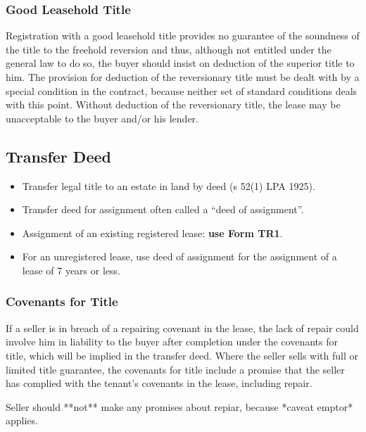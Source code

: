\documentclass[
]{article}
\newenvironment{Shaded}{}{}
\newcommand{\NormalTok}[1]{#1}
\providecommand{\tightlist}{%
  \setlength{\itemsep}{0pt}\setlength{\parskip}{0pt}}
\begin{document}
\hypertarget{good-leasehold-title}{%
\subsubsection{Good Leasehold Title}\label{good-leasehold-title}}

Registration with a good leasehold title provides no guarantee of the
soundness of the title to the freehold reversion and thus, although not
entitled under the general law to do so, the buyer should insist on
deduction of the superior title to him. The provision for deduction of
the reversionary title must be dealt with by a special condition in the
contract, because neither set of standard conditions deals with this
point. Without deduction of the reversionary title, the lease may be
unacceptable to the buyer and/or his lender.

\hypertarget{transfer-deed}{%
\subsection{Transfer Deed}\label{transfer-deed}}

\begin{itemize}
\tightlist
\item
  Transfer legal title to an estate in land by deed (s 52(1) LPA 1925).
\item
  Transfer deed for assignment often called a ``deed of assignment''.
\item
  Assignment of an existing registered lease: \textbf{use Form TR1}.
\item
  For an unregistered lease, use deed of assignment for the assignment
  of a lease of 7 years or less.
\end{itemize}

\hypertarget{covenants-for-title}{%
\subsubsection{Covenants for Title}\label{covenants-for-title}}

If a seller is in breach of a repairing covenant in the lease, the lack
of repair could involve him in liability to the buyer after completion
under the covenants for title, which will be implied in the transfer
deed. Where the seller sells with full or limited title guarantee, the
covenants for title include a promise that the seller has complied with
the tenant's covenants in the lease, including repair.

\begin{Shaded}
\begin{Highlighting}[]
\NormalTok{Seller should **not** make any promises about repiar, because *caveat emptor* applies.}
\end{Highlighting}
\end{Shaded}
\end{document}
